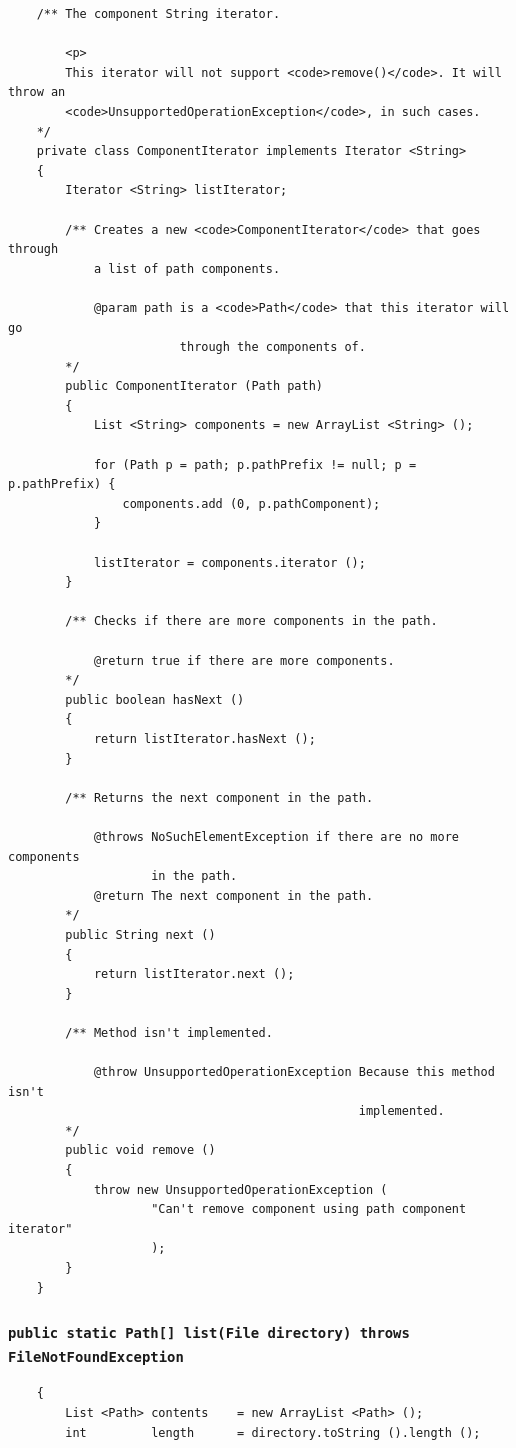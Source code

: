 \documentclass [10pt, a4paper]{article}
\begin{document}
\begin {verbatim}
    /** The component String iterator.

        <p>
        This iterator will not support <code>remove()</code>. It will throw an
        <code>UnsupportedOperationException</code>, in such cases.
    */
    private class ComponentIterator implements Iterator <String>
    {
        Iterator <String> listIterator;

        /** Creates a new <code>ComponentIterator</code> that goes through
            a list of path components.

            @param path is a <code>Path</code> that this iterator will go
                        through the components of.
        */
        public ComponentIterator (Path path)
        {
            List <String> components = new ArrayList <String> ();

            for (Path p = path; p.pathPrefix != null; p = p.pathPrefix) {
                components.add (0, p.pathComponent);
            }

            listIterator = components.iterator ();
        }

        /** Checks if there are more components in the path.

            @return true if there are more components.
        */
        public boolean hasNext ()
        {
            return listIterator.hasNext ();
        }

        /** Returns the next component in the path.

            @throws NoSuchElementException if there are no more components
                    in the path.
            @return The next component in the path.
        */
        public String next ()
        {
            return listIterator.next ();
        }

        /** Method isn't implemented.

            @throw UnsupportedOperationException Because this method isn't
                                                 implemented.
        */ 
        public void remove ()
        {
            throw new UnsupportedOperationException (
                    "Can't remove component using path component iterator"
                    );
        }
    }
\end {verbatim}

\subsubsection{\texttt{public static Path[] list(File directory) throws
FileNotFoundException}}
\begin {verbatim}
    {
        List <Path> contents    = new ArrayList <Path> ();
        int         length      = directory.toString ().length ();


\end{verbatim}
\end{document}
